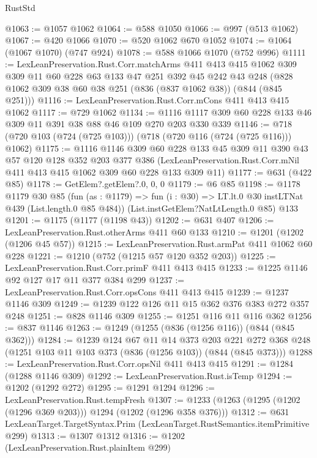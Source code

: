 \begin{lexlean}{RustStd}
\begin{coremodule}
@1063 := @1057 @1062
@1064 := @588 @1050
@1066 := @997 (@513 @1062)
@1067 := @420 @1066
@1070 := @520 @1062 @670 @1052
@1074 := @1064 (@1067 @1070) (@747 @924)
@1078 := @588 @1066 @1070 (@752 @996)
@1111 := LexLeanPreservation.Rust.Corr.matchArms
    @411
    @413
    @415
    @1062
    @309
    @309
    @11
    @60
    @228
    @63
    @133
    @47
    @251
    @392
    @45
    @242
    @43
    @248
    (@828 @1062 @309 @38 @60 @38 @251 (@836 (@837 @1062 @38)) (@844 (@845 @251)))
@1116 := LexLeanPreservation.Rust.Corr.mCons @411 @413 @415 @1062
@1117 := @729 @1062
@1134 := @1116 @1117 @309 @60 @228 @133 @46 @309 @11 @391 @38 @88 @46 @109 @270 @203 @330 @339
@1146 := @718 (@720 @103 (@724 (@725 @103))) (@718 (@720 @116 (@724 (@725 @116))) @1062)
@1175 := @1116
    @1146
    @309
    @60
    @228
    @133
    @45
    @309
    @11
    @390
    @43
    @57
    @120
    @128
    @352
    @203
    @377
    @386
    (LexLeanPreservation.Rust.Corr.mNil @411 @413 @415 @1062 @309 @60 @228 @133 @309 @11)
@1177 := @631 (@422 @85)
@1178 := GetElem?.getElem?.{0, 0, 0}
@1179 := @6 @85
@1198 := @1178
    @1179
    @30
    @85
    (fun (as : @1179) => fun (i : @30) => LT.lt.{0} @30 instLTNat @439 (List.length.{0} @85 @484))
    (List.instGetElem?NatLtLength.{0} @85)
    @133
@1201 := @1175 (@1177 (@1198 @43))
@1202 := @631 @407
@1206 := LexLeanPreservation.Rust.otherArms @411 @60 @133
@1210 := @1201 (@1202 (@1206 @45 @57))
@1215 := LexLeanPreservation.Rust.armPat @411 @1062 @60 @228
@1221 := @1210 (@752 (@1215 @57 @120 @352 @203))
@1225 := LexLeanPreservation.Rust.Corr.primF @411 @413 @415
@1233 := @1225 @1146 @92 @127 @17 @11 @377 @384 @299
@1237 := LexLeanPreservation.Rust.Corr.opsCons @411 @413 @415
@1239 := @1237 @1146 @309
@1249 := @1239 @122 @126 @11 @15 @362 @376 @383 @272 @357 @248
@1251 := @828 @1146 @309
@1255 := @1251 @116 @11 @116 @362
@1256 := @837 @1146
@1263 := @1249 (@1255 (@836 (@1256 @116)) (@844 (@845 @362)))
@1284 := @1239
    @124
    @67
    @11
    @14
    @373
    @203
    @221
    @272
    @368
    @248
    (@1251 @103 @11 @103 @373 (@836 (@1256 @103)) (@844 (@845 @373)))
@1288 := LexLeanPreservation.Rust.Corr.opsNil @411 @413 @415
@1291 := @1284 (@1288 @1146 @309)
@1292 := LexLeanPreservation.Rust.isTemp
@1294 := @1202 (@1292 @272)
@1295 := @1291 @1294
@1296 := LexLeanPreservation.Rust.tempFresh
@1307 := @1233 (@1263 (@1295 (@1202 (@1296 @369 @203))) @1294 (@1202 (@1296 @358 @376)))
@1312 := @631 LexLeanTarget.TargetSyntax.Prim (LexLeanTarget.RustSemantics.itemPrimitive @299)
@1313 := @1307 @1312
@1316 := @1202 (LexLeanPreservation.Rust.plainItem @299)

\end{coremodule}
\end{lexlean}
